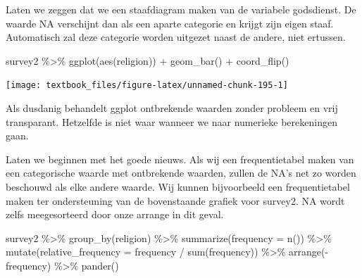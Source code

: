 \documentclass[]{tufte-book}
\newenvironment{Shaded}{}{}
\newcommand{\AttributeTok}[1]{\textcolor[rgb]{0.49,0.56,0.16}{#1}}
\newcommand{\FunctionTok}[1]{\textcolor[rgb]{0.02,0.16,0.49}{#1}}
\newcommand{\NormalTok}[1]{#1}
\newcommand{\SpecialCharTok}[1]{\textcolor[rgb]{0.25,0.44,0.63}{#1}}
\begin{document}
Laten we zeggen dat we een staafdiagram maken van de variabele godsdienst. De waarde NA verschijnt dan als een aparte categorie en krijgt zijn eigen staaf. Automatisch zal deze categorie worden uitgezet naast de andere, niet ertussen.

\begin{Shaded}
\begin{Highlighting}[]
\NormalTok{survey2 }\SpecialCharTok{\%\textgreater{}\%}
  \FunctionTok{ggplot}\NormalTok{(}\FunctionTok{aes}\NormalTok{(religion)) }\SpecialCharTok{+}
  \FunctionTok{geom\_bar}\NormalTok{() }\SpecialCharTok{+}
  \FunctionTok{coord\_flip}\NormalTok{()}
\end{Highlighting}
\end{Shaded}

\texttt{[image: textbook\_files/figure-latex/unnamed-chunk-195-1]}

Als dusdanig behandelt ggplot ontbrekende waarden zonder probleem en vrij transparant. Hetzelfde is niet waar wanneer we naar numerieke berekeningen gaan.

Laten we beginnen met het goede nieuws. Als wij een frequentietabel maken van een categorische waarde met ontbrekende waarden, zullen de NA's net zo worden beschouwd als elke andere waarde. Wij kunnen bijvoorbeeld een frequentietabel maken ter ondersteuning van de bovenstaande grafiek voor survey2. NA wordt zelfs meegesorteerd door onze arrange in dit geval.

\begin{Shaded}
\begin{Highlighting}[]
\NormalTok{survey2 }\SpecialCharTok{\%\textgreater{}\%}
  \FunctionTok{group\_by}\NormalTok{(religion) }\SpecialCharTok{\%\textgreater{}\%}
  \FunctionTok{summarize}\NormalTok{(}\AttributeTok{frequency =} \FunctionTok{n}\NormalTok{()) }\SpecialCharTok{\%\textgreater{}\%}
  \FunctionTok{mutate}\NormalTok{(}\AttributeTok{relative\_frequency =}\NormalTok{ frequency }\SpecialCharTok{/} \FunctionTok{sum}\NormalTok{(frequency)) }\SpecialCharTok{\%\textgreater{}\%}
  \FunctionTok{arrange}\NormalTok{(}\SpecialCharTok{{-}}\NormalTok{frequency) }\SpecialCharTok{\%\textgreater{}\%}
  \FunctionTok{pander}\NormalTok{()}
\end{Highlighting}
\end{Shaded}
\end{document}
